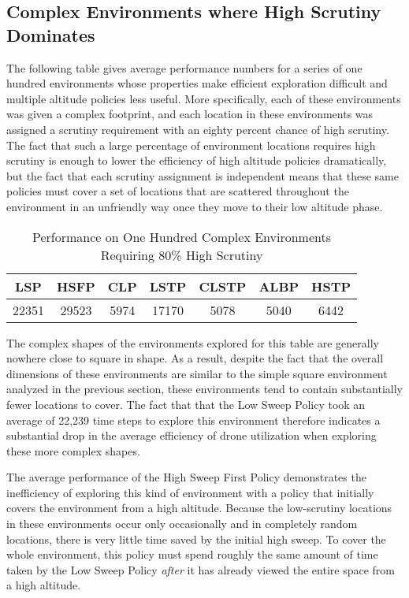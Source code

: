 \subsection{Complex Environments where High Scrutiny Dominates}

The following table gives average performance numbers for a series of one hundred environments whose properties make efficient exploration difficult and multiple altitude policies less useful. More specifically, each of these environments was given a complex footprint, and each location in these environments was assigned a scrutiny requirement with an eighty percent chance of high scrutiny. The fact that such a large percentage of environment locations requires high scrutiny is enough to lower the efficiency of high altitude policies dramatically, but the fact that each scrutiny assignment is independent means that these same policies must cover a set of locations that are scattered throughout the environment in an unfriendly way once they move to their low altitude phase.

\begin{table}[h]
\begin{center}
 \begin{tabular}{||c c c c c c c ||}
 \hline
 LSP   & HSFP  & CLP  & LSTP  & CLSTP & ALBP & HSTP \\
 \hline
 22351 & 29523 & 5974 & 17170 & 5078  & 5040 & 6442 \\
 \hline
 \end{tabular}
\end{center}
\caption{Performance on One Hundred Complex Environments Requiring 80\% High Scrutiny}
\end{table}

The complex shapes of the environments explored for this table are generally nowhere close to square in shape. As a result, despite the fact that the overall dimensions of these environments are similar to the simple square environment analyzed in the previous section, these environments tend to contain substantially fewer locations to cover. The fact that that the Low Sweep Policy took an average of 22,239 time steps to explore this environment therefore indicates a substantial drop in the average efficiency of drone utilization when exploring these more complex shapes.

The average performance of the High Sweep First Policy demonstrates the inefficiency of exploring this kind of environment with a policy that initially covers the environment from a high altitude. Because the low-scrutiny locations in these environments occur only occasionally and in completely random locations, there is very little time saved by the initial high sweep. To cover the whole environment, this policy must spend roughly the same amount of time taken by the Low Sweep Policy \textit{after} it has already viewed the entire space from a high altitude.

